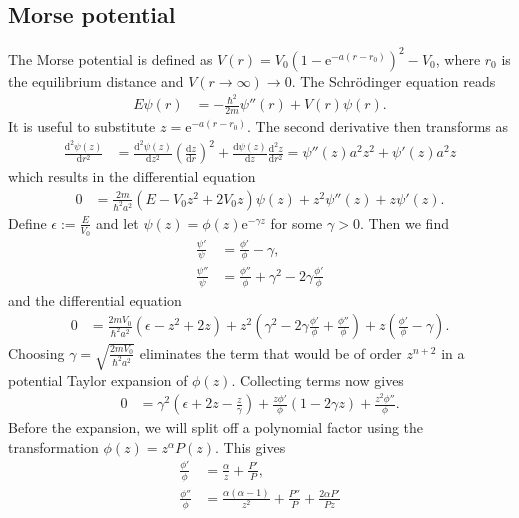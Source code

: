 \documentclass[english, parskip=full]{scrartcl}
\newcommand{\kla}{}
\newcommand{\tecxt}{}
\newcommand{\e}{\text{e}}
\begin{document}
\subsection{Morse potential}
The Morse potential is defined as $V(r) = V_0\kla\left( 1 - \e^{-a(r-r_0)} \right)^2 - V_0$, where $r_0$ is the equilibrium distance and $V(r\rightarrow\infty) \rightarrow 0$.
The Schrödinger equation reads
\begin{align}
E\psi(r) &= -\frac{\hbar^2}{2m}\psi''(r) + V(r)\psi(r).
\end{align}
It is useful to substitute $z = \e^{-a(r-r_0)}$.
The second derivative then transforms as
\begin{align}
\frac{\tecxt\text{d}^2\psi(z)}{\tecxt\text{d}r^2} &= \frac{\tecxt\text{d}^2\psi(z)}{\tecxt\text{d}z^2} \kla\left( \frac{\tecxt\text{d}z}{\tecxt\text{d}r} \right)^2 + \frac{\tecxt\text{d} \psi(z)}{\tecxt\text{d}z} \frac{\tecxt\text{d}^2z}{\tecxt\text{d}r^2} = \psi''(z)a^2z^2 + \psi'(z)a^2z
\end{align}
which results in the differential equation
\begin{align}
0 &= \frac{2m}{\hbar^2a^2} \kla\left( E - V_0z^2 + 2V_0z \right)\psi(z) + z^2\psi''(z) + z\psi'(z).
\end{align}
Define $\epsilon := \frac{E}{V_0}$ and let $\psi(z) = \phi(z) \e^{-\gamma z}$ for some $\gamma > 0$.
Then we find
\begin{align}
\frac{\psi'}{\psi} &= \frac{\phi'}{\phi} - \gamma,\\
\frac{\psi''}{\psi} &= \frac{\phi''}{\phi} + \gamma^2 - 2\gamma \frac{\phi'}{\phi}
\end{align}
and the differential equation
\begin{align}
0 &= \frac{2mV_0}{\hbar^2a^2} \kla\left( \epsilon - z^2 + 2z \right) + z^2 \kla\left( \gamma^2 - 2\gamma \frac{\phi'}{\phi} + \frac{\phi''}{\phi} \right) + z\kla\left( \frac{\phi'}{\phi} - \gamma \right).
\end{align}
Choosing $\gamma = \sqrt{\frac{2mV_0}{\hbar^2a^2}}$ eliminates the term that would be of order $z^{n+2}$ in a potential Taylor expansion of $\phi(z)$.
Collecting terms now gives
\begin{align}
0 &= \gamma^2 \kla\left( \epsilon + 2z - \frac{z}{\gamma} \right) + \frac{z\phi'}{\phi} \kla\left( 1 - 2\gamma z \right) + \frac{z^2\phi''}{\phi}.
\end{align}
Before the expansion, we will split off a polynomial factor using the transformation $\phi(z) = z^\alpha P(z)$.
This gives
\begin{align}
\frac{\phi'}{\phi} &= \frac{\alpha}{z} + \frac{P'}{P},\\
\frac{\phi''}{\phi} &= \frac{\alpha(\alpha - 1)}{z^2} + \frac{P''}{P} + \frac{2\alpha P'}{Pz}
\end{align}
\end{document}
